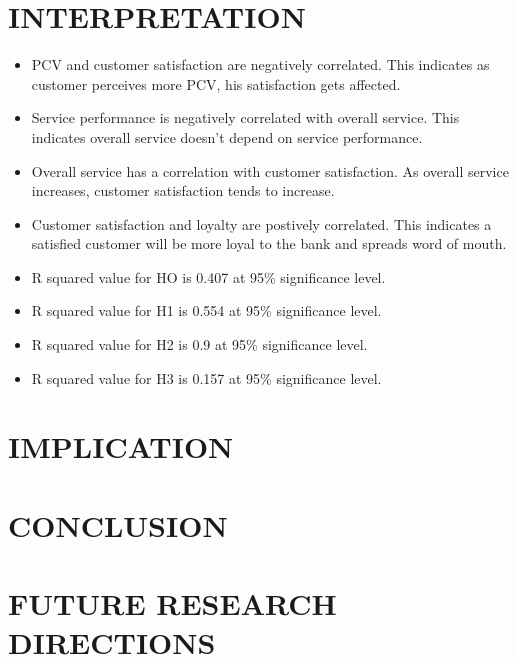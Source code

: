 \documentclass[a4paper, 14pt]{article}
\begin{document}
{\section*{INTERPRETATION}
\begin{itemize}
\item PCV and customer satisfaction are negatively correlated. This indicates as customer perceives more PCV, his satisfaction gets affected.
\item Service performance is negatively correlated with overall service. This indicates overall service doesn't depend on service performance. 
\item Overall service has a correlation with customer satisfaction. As overall service increases, customer satisfaction tends to increase.
\item Customer satisfaction and loyalty are postively correlated. This indicates a satisfied customer will be more loyal to the bank and spreads word of mouth.
\item R squared value for HO is 0.407 at 95\% significance level.
\item R squared value for H1 is 0.554 at 95\% significance level.
\item R squared value for H2 is 0.9 at 95\% significance level.
\item R squared value for H3 is 0.157 at 95\% significance level.
\end{itemize}
\section*{IMPLICATION}
\section*{CONCLUSION}
\section*{FUTURE RESEARCH DIRECTIONS}
}
\end{document}
